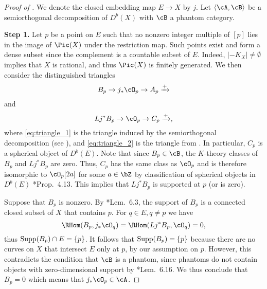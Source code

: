 \begin{proof}[Proof of ]
    
We denote the closed embedding map $E\to X$ by $j$. 
Let $\langle \cA,\cB\rangle$ be a semiorthogonal decomposition of $D^b(X)$ with $\cB$ a phantom category. 

\smallskip
{\bf Step 1.} Let $p$ be a point on $E$ such that no nonzero integer multiple of $[p]$ lies in the image of $\Pic(X)$ under the restriction map. Such points exist and form a dense subset since the complement is a countable subset of $E$. Indeed, $|-K_X|\neq \emptyset$ implies that $X$ is rational, and thus $\Pic(X)$ is finitely generated. We then consider the distinguished triangles
\begin{equation}
    B_p\to j_\ast \cO_p\to A_p \xrightarrow{+   } \label{eq:triangle_1}
\end{equation}
and
\begin{equation}
    Lj^\ast B_p \to \cO_p \to C_p \xrightarrow{+   }, \label{eq:triangle_2}
\end{equation}
 where \eqref{eq:triangle_1} is the triangle induced by the semiorthogonal decomposition (see ), and \eqref{eq:triangle_2} is the triangle from . In particular, $C_p$ is a spherical object of $D^b(E)$. Note that since $B_p\in \cB$, the $K$-theory classes of $B_p$ and $Lj^\ast B_p$ are zero. Thus, $C_p$ has the same class as $\cO_p$ and is therefore isomorphic to $\cO_p[2a]$ for some $a\in \bZ$ by classification of spherical objects in $D^b(E)$ \cite{BK06}*{Prop.~4.13}. This implies that $Lj^\ast B_p$ is supported at $p$ (or is zero).

Suppose that $B_p$ is nonzero. By \cite{P23}*{Lem.~6.3}, the support of $B_p$ is a connected closed subset of $X$ that contains $p$. For $q\in E, q\neq p$ we have 
\[
\RHom(B_p, j_\ast\cO_q) = \RHom(Lj^\ast B_p,\cO_q) = 0,
\]
thus ${\rm Supp}(B_p)\cap E =\{p\}$. It follows that ${\rm Supp}(B_p)=\{p\}$ because there are no curves on $X$ that intersect $E$ only at $p$, by our assumption on $p$. However, this contradicts the condition that $\cB$ is a phantom, since phantoms do not contain objects with zero-dimensional support by \cite{P23}*{Lem.~6.16}. We thus conclude that $B_p=0$ which means that $j_\ast\cO_p \in \cA$.
    

\end{proof}
